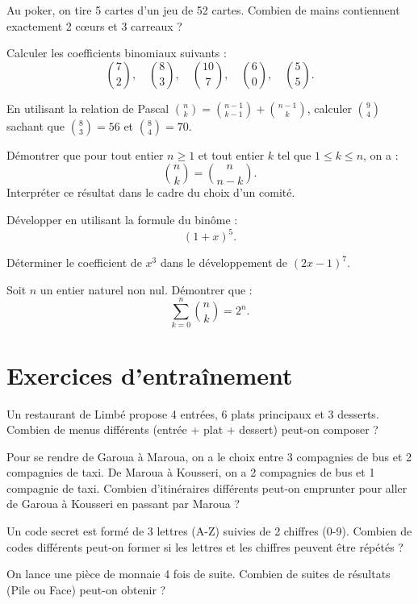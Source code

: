 \exo{}
Au poker, on tire 5 cartes d'un jeu de 52 cartes. Combien de mains contiennent exactement 2 cœurs et 3 carreaux ?


\exo{}
Calculer les coefficients binomiaux suivants :
\[
\binom{7}{2},\quad \binom{8}{3},\quad \binom{10}{7},\quad \binom{6}{0},\quad \binom{5}{5}.
\]

\exo{}
En utilisant la relation de Pascal $\binom{n}{k} = \binom{n-1}{k-1} + \binom{n-1}{k}$, calculer $\binom{9}{4}$ sachant que $\binom{8}{3}=56$ et $\binom{8}{4}=70$.

\exo{}
Démontrer que pour tout entier $n \ge 1$ et tout entier $k$ tel que $1 \le k \le n$, on a :
\[
\binom{n}{k} = \binom{n}{n-k}.
\]
Interpréter ce résultat dans le cadre du choix d'un comité.


\exo{}
Développer en utilisant la formule du binôme :
\[
(1+x)^5.
\]

\exo{}
Déterminer le coefficient de $x^3$ dans le développement de $(2x-1)^7$.

\exo{}
Soit $n$ un entier naturel non nul. Démontrer que :
\[
\sum_{k=0}^{n} \binom{n}{k} = 2^n.
\]

\section{Exercices d'entraînement}


\exo{}
Un restaurant de Limbé propose 4 entrées, 6 plats principaux et 3 desserts. Combien de menus différents (entrée + plat + dessert) peut-on composer ?

\exo{}
Pour se rendre de Garoua à Maroua, on a le choix entre 3 compagnies de bus et 2 compagnies de taxi. De Maroua à Kousseri, on a 2 compagnies de bus et 1 compagnie de taxi. Combien d'itinéraires différents peut-on emprunter pour aller de Garoua à Kousseri en passant par Maroua ?

\exo{}
Un code secret est formé de 3 lettres (A-Z) suivies de 2 chiffres (0-9). Combien de codes différents peut-on former si les lettres et les chiffres peuvent être répétés ?


\exo{}
On lance une pièce de monnaie 4 fois de suite. Combien de suites de résultats (Pile ou Face) peut-on obtenir ?

